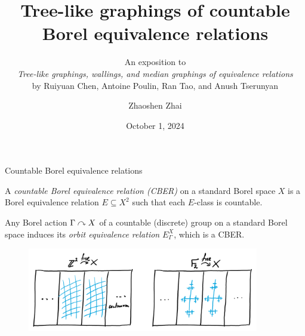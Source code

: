 \documentclass{beamer}
\title{\normalsize{Tree-like graphings of countable Borel equivalence relations}}
\subtitle{\scriptsize{An exposition to\\\textit{Tree-like graphings, wallings, and median graphings of equivalence relations}\\by Ruiyuan Chen, Antoine Poulin, Ran Tao, and Anush Tserunyan}}
\author{\small Zhaoshen Zhai}
\date{\footnotesize October 1, 2024}
\begin{document}
\frame{\titlepage}
    \begin{frame}{Countable Borel equivalence relations}
        \begin{definition}
            A \textit{countable Borel equivalence relation (CBER)} on a standard Borel space $X$ is a Borel equivalence relation $E\subseteq X^2$ such that each $E$-class is countable.
        \end{definition}

        \pause
        \vspace{-0.1in}

        \begin{example}
            Any Borel action $\Gamma\curvearrowright X$ of a countable (discrete) group on a standard Borel space induces its \textit{orbit equivalence relation} $E^X_\Gamma$, which is a CBER.
        \end{example}

        \pause
        \vspace{-0.15in}

        \begin{figure}[h]
            \center
            \includegraphics[width=0.9\textwidth]{img/group_action.png}
        \end{figure}
    \end{frame}
\end{document}
